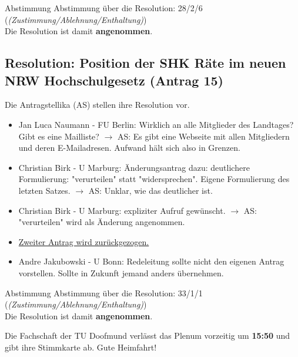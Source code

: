     \begin{success}{Abstimmung}
      Abstimmung über die Resolution: 28/2/6 (\textit{(Zustimmung/Ablehnung/Enthaltung)}) \\
      Die Resolution ist damit \textbf{angenommen}.
    \end{success}

  \subsection{Resolution: Position der SHK Räte im neuen NRW Hochschulgesetz (Antrag 15)}
    Die Antragstellika (AS) stellen ihre Resolution vor.
    \begin{itemize}
      \item Jan Luca Naumann - FU Berlin:  Wirklich an alle Mitglieder des Landtages? Gibt es eine Mailliste?
        $\rightarrow$ AS: Es gibt eine Webseite mit allen Mitgliedern und deren E-Mailadresen. Aufwand hält sich also in Grenzen.

      \item Christian Birk - U Marburg:  Änderungsantrag dazu: deutlichere Formulierung: "verurteilen" statt "widersprechen". Eigene Formulierung des letzten Satzes.
        $\rightarrow$ AS: Unklar, wie das deutlicher ist.
      \item Christian Birk - U Marburg:  expliziter Aufruf gewünscht.
        $\rightarrow$ AS: "verurteilen" wird als Änderung angenommen.
      \item \underline{Zweiter Antrag wird zurückgezogen.}
      \item Andre Jakubowski - U Bonn:  Redeleitung sollte nicht den eigenen Antrag vorstellen. Sollte in Zukunft jemand anders übernehmen.
    \end{itemize}

    \begin{success}{Abstimmung}
      Abstimmung über die Resolution: 33/1/1 (\textit{(Zustimmung/Ablehnung/Enthaltung)}) \\
      Die Resolution ist damit \textbf{angenommen}.
    \end{success}

    \begin{info}{}
      Die Fachschaft der TU Doofmund verlässt das Plenum vorzeitig um \textbf{15:50} und gibt ihre Stimmkarte ab. Gute Heimfahrt!
    \end{info}

